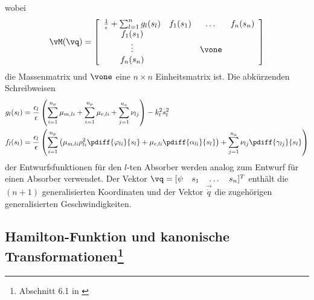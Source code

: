%
%
%
wobei
\begin{equation}
	\vM(\vq) = 			\left[\begin{array}{cccc}
												\frac{1}{\epsilon} + \sum_{l=1}^n g_l(s_l) 	& f_1(s_1) & \dots  & f_n(s_n) 	\\
													f_1(s_1)																	&   			 & 			 &  	  \\
													\vdots																		&   			 & \vone &  	  \\
													f_n(s_n)																	&   			 & 			 &  	  \\
												\end{array} \right]
	\label{eq:SkalierteLagrangeFunktionfuerMehrereAbsorbersystemMassenmatrix}
\end{equation}
die Massenmatrix und $\vone$ eine $n\times n$ Einheitsmatrix ist. 
%
%
%
Die abkürzenden Schreibweisen
\begin{align}
	g_l(s_l) &= \frac{\epsilon_l}{\epsilon} \left(\sum^{n_p}_{i=1}{\mu_{m,li}} + \sum^{n_p}_{i=1}{\mu_{r,li}} + \sum^{n_a}_{j=1}{\nu_{lj}} \right) - k_l^2 s_l^2  	\label{eq:AbkuerzungenSchreibweisegMehereAbsorber} \\ 
	f_l(s_l) &= \frac{\epsilon_l}{\epsilon} \left( \sum^{n_p}_{i=1}{\left(\mu_{m,li} \rho_{li}^2 \pdiff{\varphi_{li}}{{s_l}} + \mu_{r,li} \pdiff{\alpha_{li}}{{s_l}}  \right)} + \sum^{n_a}_{j=1}{\nu_{lj} \pdiff{\gamma_{lj}}{{s_l}}} \right)
	\label{eq:AbkuerzungenSchreibweisefMehereAbsorber}
\end{align}
der Entwurfsfunktionen für den $l$-ten Absorber werden analog zum Entwurf für einen Absorber verwendet.
Der Vektor $\vq = [\psi \quad s_1 \quad \dots \quad s_n]^T$ enthält die $(n+1)$ generalisierten Koordinaten 
und  der Vektor $\vec{\dot{q}}$ die zugehörigen generalisierten Geschwindigkeiten.













%
%
%
%
%
\subsection[Hamilton-Funktion und kanonische Transformationen]
	{Hamilton-Funktion und kanonische Transformationen\footnote{Abschnitt 6.1 in \cite{Mayet:Tautochronic}}} 

\label{subsec:TautDesignTrafos}

